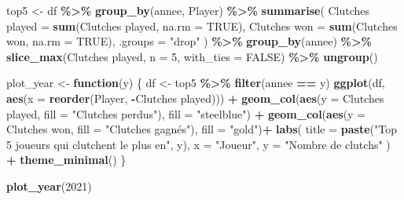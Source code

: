 \documentclass[
]{article}
\newenvironment{Shaded}{\begin{snugshade}}{\end{snugshade}}
\newcommand{\AttributeTok}[1]{\textcolor[rgb]{0.13,0.29,0.53}{#1}}
\newcommand{\ConstantTok}[1]{\textcolor[rgb]{0.56,0.35,0.01}{#1}}
\newcommand{\ControlFlowTok}[1]{\textcolor[rgb]{0.13,0.29,0.53}{\textbf{#1}}}
\newcommand{\DecValTok}[1]{\textcolor[rgb]{0.00,0.00,0.81}{#1}}
\newcommand{\FunctionTok}[1]{\textcolor[rgb]{0.13,0.29,0.53}{\textbf{#1}}}
\newcommand{\NormalTok}[1]{#1}
\newcommand{\OtherTok}[1]{\textcolor[rgb]{0.56,0.35,0.01}{#1}}
\newcommand{\SpecialCharTok}[1]{\textcolor[rgb]{0.81,0.36,0.00}{\textbf{#1}}}
\newcommand{\StringTok}[1]{\textcolor[rgb]{0.31,0.60,0.02}{#1}}
\begin{document}
\begin{Shaded}
\begin{Highlighting}[]
\NormalTok{top5 }\OtherTok{\textless{}{-}}\NormalTok{ df }\SpecialCharTok{\%\textgreater{}\%}
  \FunctionTok{group\_by}\NormalTok{(annee, Player) }\SpecialCharTok{\%\textgreater{}\%}
  \FunctionTok{summarise}\NormalTok{(}
    \StringTok{\textasciigrave{}}\AttributeTok{Clutches played}\StringTok{\textasciigrave{}} \OtherTok{=} \FunctionTok{sum}\NormalTok{(}\StringTok{\textasciigrave{}}\AttributeTok{Clutches played}\StringTok{\textasciigrave{}}\NormalTok{, }\AttributeTok{na.rm =} \ConstantTok{TRUE}\NormalTok{),}
    \StringTok{\textasciigrave{}}\AttributeTok{Clutches won}\StringTok{\textasciigrave{}} \OtherTok{=} \FunctionTok{sum}\NormalTok{(}\StringTok{\textasciigrave{}}\AttributeTok{Clutches won}\StringTok{\textasciigrave{}}\NormalTok{, }\AttributeTok{na.rm =} \ConstantTok{TRUE}\NormalTok{),}
    \AttributeTok{.groups =} \StringTok{"drop"}
\NormalTok{  ) }\SpecialCharTok{\%\textgreater{}\%}
  \FunctionTok{group\_by}\NormalTok{(annee) }\SpecialCharTok{\%\textgreater{}\%}
  \FunctionTok{slice\_max}\NormalTok{(}\StringTok{\textasciigrave{}}\AttributeTok{Clutches played}\StringTok{\textasciigrave{}}\NormalTok{, }\AttributeTok{n =} \DecValTok{5}\NormalTok{, }\AttributeTok{with\_ties =} \ConstantTok{FALSE}\NormalTok{) }\SpecialCharTok{\%\textgreater{}\%}
  \FunctionTok{ungroup}\NormalTok{()}

\NormalTok{plot\_year }\OtherTok{\textless{}{-}} \ControlFlowTok{function}\NormalTok{(y) \{}
\NormalTok{  df }\OtherTok{\textless{}{-}}\NormalTok{ top5 }\SpecialCharTok{\%\textgreater{}\%} \FunctionTok{filter}\NormalTok{(annee }\SpecialCharTok{==}\NormalTok{ y)}
  \FunctionTok{ggplot}\NormalTok{(df, }\FunctionTok{aes}\NormalTok{(}\AttributeTok{x =} \FunctionTok{reorder}\NormalTok{(Player, }\SpecialCharTok{{-}}\StringTok{\textasciigrave{}}\AttributeTok{Clutches played}\StringTok{\textasciigrave{}}\NormalTok{))) }\SpecialCharTok{+}
    \FunctionTok{geom\_col}\NormalTok{(}\FunctionTok{aes}\NormalTok{(}\AttributeTok{y =} \StringTok{\textasciigrave{}}\AttributeTok{Clutches played}\StringTok{\textasciigrave{}}\NormalTok{, }\AttributeTok{fill =} \StringTok{"Clutches perdus"}\NormalTok{), }\AttributeTok{fill =} \StringTok{"steelblue"}\NormalTok{) }\SpecialCharTok{+}
    \FunctionTok{geom\_col}\NormalTok{(}\FunctionTok{aes}\NormalTok{(}\AttributeTok{y =} \StringTok{\textasciigrave{}}\AttributeTok{Clutches won}\StringTok{\textasciigrave{}}\NormalTok{, }\AttributeTok{fill =} \StringTok{"Clutches gagnés"}\NormalTok{), }\AttributeTok{fill =} \StringTok{"gold"}\NormalTok{)}\SpecialCharTok{+}
    \FunctionTok{labs}\NormalTok{(}
      \AttributeTok{title =} \FunctionTok{paste}\NormalTok{(}\StringTok{"Top 5 joueurs qui clutchent le plus en"}\NormalTok{, y),}
      \AttributeTok{x =} \StringTok{"Joueur"}\NormalTok{,}
      \AttributeTok{y =} \StringTok{"Nombre de clutchs"}
\NormalTok{    ) }\SpecialCharTok{+}
    \FunctionTok{theme\_minimal}\NormalTok{()}
\NormalTok{\}}

\FunctionTok{plot\_year}\NormalTok{(}\DecValTok{2021}\NormalTok{)}
\end{Highlighting}
\end{Shaded}
\end{document}
